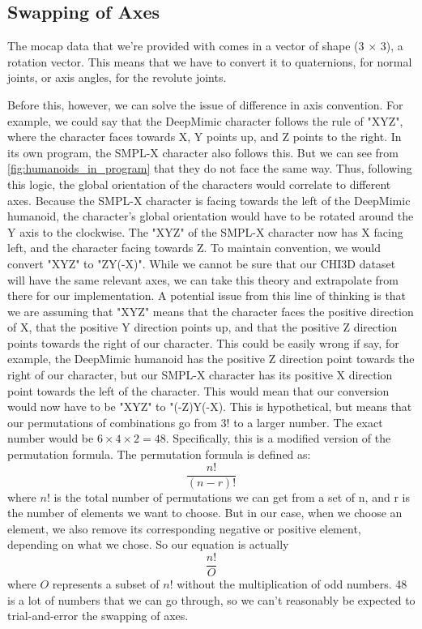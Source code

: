 \documentclass{l4proj}
\begin{document}
\subsection{Swapping of Axes}

The mocap data that we're provided with comes in a vector of shape (3 $\times$ 3), a rotation vector. This means that we have to convert it to quaternions, for normal joints, or axis angles, for the revolute joints.

Before this, however, we can solve the issue of difference in axis convention. For example, we could say that the DeepMimic character follows the rule of "XYZ", where the character faces towards X, Y points up, and Z points to the right. In its own program, the SMPL-X character also follows this. But we can see from \ref{fig:humanoids_in_program} that they do not face the same way. Thus, following this logic, the global orientation of the characters would correlate to different axes. Because the SMPL-X character is facing towards the left of the DeepMimic humanoid, the character's global orientation would have to be rotated around the Y axis to the clockwise. The "XYZ" of the SMPL-X character now has X facing left, and the character facing towards Z. To maintain convention, we would convert "XYZ" to "ZY(-X)". While we cannot be sure that our CHI3D dataset will have the same relevant axes, we can take this theory and extrapolate from there for our implementation. A potential issue from this line of thinking is that we are assuming that "XYZ" means that the character faces the positive direction of X, that the positive Y direction points up, and that the positive Z direction points towards the right of our character. This could be easily wrong if say, for example, the DeepMimic humanoid has the positive Z direction point towards the right of our character, but our SMPL-X character has its positive X direction point towards the left of the character. This would mean that our conversion would now have to be "XYZ" to "(-Z)Y(-X). This is hypothetical, but means that our permutations of combinations go from $3!$ to a larger number. The exact number would be $6 \times 4 \times 2 = 48$. Specifically, this is a modified version of the permutation formula. The permutation formula is defined as:
\begin{equation}
  \frac{n!}{(n-r)!}
\end{equation}
where $n!$ is the total number of permutations we can get from a set of n, and r is the number of elements we want to choose.
But in our case, when we choose an element, we also remove its corresponding negative or positive element, depending on what we chose. So our equation is actually
\begin{equation}
  \frac{n!}{O}
\end{equation}
where $O$ represents a subset of $n!$ without the multiplication of odd numbers. 48 is a lot of numbers that we can go through, so we can't reasonably be expected to trial-and-error the swapping of axes.
\end{document}
